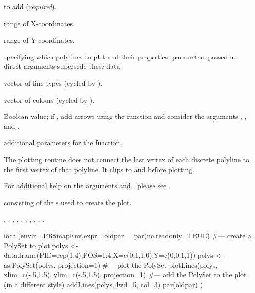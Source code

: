 \documentclass[letterpaper]{book}
\begin{document}
\begin{Arguments}
\begin{ldescription}
\item[\code{polys}]  to add (\emph{required}).
\item[\code{xlim}] range of X-coordinates.
\item[\code{ylim}] range of Y-coordinates.
\item[\code{polyProps}]  specifying which polylines to plot and their
properties.   parameters passed as direct arguments
supersede these data.
\item[\code{lty}] vector of line types (cycled by ).
\item[\code{col}] vector of colours (cycled by ).
\item[\code{arrows}] Boolean value; if , add arrows using the
 function and consider the arguments ,
, and .
\item[\code{...}] additional  parameters for the
 function.
\end{ldescription}
\end{Arguments}
%
\begin{Details}\relax
The plotting routine does not connect the last vertex of each discrete
polyline to the first vertex of that polyline. It clips 
to  and  before plotting.

For additional help on the arguments  and , please
see .
\end{Details}
%
\begin{Value}
 consisting of the s used to create the plot.
\end{Value}
%
\begin{SeeAlso}\relax
{},
,
,
,
,
,
,
,
,
.
\end{SeeAlso}
%
\begin{Examples}
\begin{ExampleCode}
local(envir=.PBSmapEnv,expr={
  oldpar = par(no.readonly=TRUE)
  #--- create a PolySet to plot
  polys <- data.frame(PID=rep(1,4),POS=1:4,X=c(0,1,1,0),Y=c(0,0,1,1))
  polys <- as.PolySet(polys, projection=1)
  #--- plot the PolySet
  plotLines(polys, xlim=c(-.5,1.5), ylim=c(-.5,1.5), projection=1)
  #--- add the PolySet to the plot (in a different style)
  addLines(polys, lwd=5, col=3)
  par(oldpar)
})
\end{ExampleCode}
\end{Examples}
\end{document}
